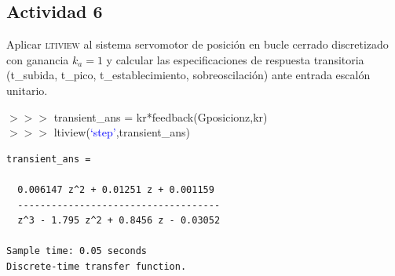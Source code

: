 \newpage
\subsection{Actividad 6}
Aplicar \textsc{ltiview} al sistema servomotor de posición en
bucle cerrado discretizado con ganancia $k_a=1$ y calcular las
especificaciones de respuesta transitoria (t\_subida, t\_pico,
t\_establecimiento, sobreoscilación) ante entrada escalón unitario.
\begin{tcolorbox}[sharp corners, colframe=bluebox, title= Sistema
  servomotor de posición.,breakable=unlimited]
  $>>>$ transient\_ans = kr*feedback(Gposicionz,kr)\\
  $>>>$ ltiview(\textcolor{blue}{`step'},transient\_ans)
  \vspace*{0.35em}
  \begin{tcolorbox}[sharp corners, colback = white]
    \color{gray}
\begin{verbatim}
transient_ans =
 
  0.006147 z^2 + 0.01251 z + 0.001159
  ------------------------------------
  z^3 - 1.795 z^2 + 0.8456 z - 0.03052
 
Sample time: 0.05 seconds
Discrete-time transfer function.
\end{verbatim}
  \end{tcolorbox}%
  \vspace*{0.5em}
\end{tcolorbox}%
